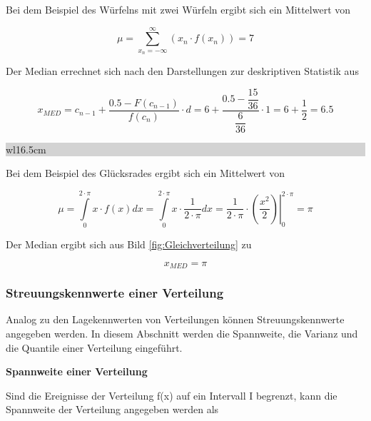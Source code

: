 \noindent Bei dem Beispiel des W\"{u}rfelns mit zwei W\"{u}rfeln ergibt sich ein Mittelwert von 

\begin{equation}\label{eq:fourfourtyseven}
\mu =\sum _{x_{n} =-\infty }^{\infty }\left(x_{n} \cdot f(x_{n} )\right) =7
\end{equation}

\noindent Der Median errechnet sich nach den Darstellungen zur deskriptiven Statistik aus

\begin{equation}\label{eq:fourfourtyeight}
x_{MED} =c_{n-1} +\dfrac{0.5-F(c_{n-1})}{f(c_{n})} \cdot d=6+\dfrac{0.5-\dfrac{15}{36} }{\dfrac{6}{36} } \cdot 1=6+\dfrac{1}{2} =6.5
\end{equation}

\noindent
\colorbox{lightgray}{%
%
\renewcommand\arraystretch{0.6}%
\begin{tabular}{ wl{16.5cm} }
{}
\end{tabular}%
}\medskip 

\noindent Bei dem Beispiel des Gl\"{u}cksrades ergibt sich ein Mittelwert von

\begin{equation}\label{eq:fourfourtynine}
\mu =\int\limits _{0}^{2\cdot \pi }x\cdot f\left(x\right)dx =\int\limits _{0}^{2\cdot \pi}x\cdot \dfrac{1}{2\cdot \pi} dx =\left. \dfrac{1}{2\cdot \pi } \cdot (\dfrac{x^{2}}{2})\right|_{0}^{2\cdot \pi} =\pi
\end{equation}

\noindent Der Median ergibt sich aus Bild \ref{fig:Gleichverteilung} zu

\begin{equation}\label{eq:fourfifty}
x_{MED} =\pi
\end{equation}

\subsubsection{Streuungskennwerte einer Verteilung}

\noindent Analog zu den Lagekennwerten von Verteilungen k\"{o}nnen Streuungskennwerte angegeben werden. In diesem Abschnitt werden die Spannweite, die Varianz und die Quantile einer Verteilung eingef\"{u}hrt.\bigskip

{\selectfont
\noindent\textbf{Spannweite einer Verteilung}}\smallskip

\noindent Sind die Ereignisse der Verteilung f(x) auf ein Intervall I begrenzt, kann die Spannweite der Verteilung angegeben werden als 

